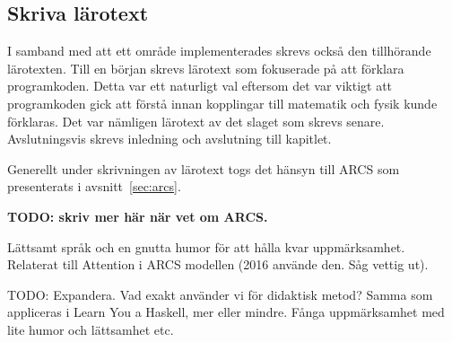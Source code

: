 \begin{draft}
\subsection{Skriva lärotext}

I samband med att ett område implementerades skrevs också den tillhörande
lärotexten. Till en början skrevs lärotext som fokuserade på att förklara
programkoden. Detta var ett naturligt val eftersom det var viktigt att
programkoden gick att förstå innan kopplingar till matematik och fysik kunde
förklaras. Det var nämligen lärotext av det slaget som skrevs senare.
Avslutningsvis skrevs inledning och avslutning till kapitlet.

\end{draft}
\begin{binge}

Generellt under skrivningen av lärotext togs det hänsyn till ARCS som
presenterats i avsnitt~\ref{sec:arcs}.

\textbf{TODO: skriv mer här när vet om ARCS.}

Lättsamt språk och en gnutta humor för att hålla kvar
uppmärksamhet. Relaterat till Attention i ARCS modellen (2016
använde den. Såg vettig ut).

TODO: Expandera. Vad exakt använder vi för didaktisk metod? Samma
som appliceras i Learn You a Haskell, mer eller mindre. Fånga
uppmärksamhet med lite humor och lättsamhet etc.

\end{binge}
